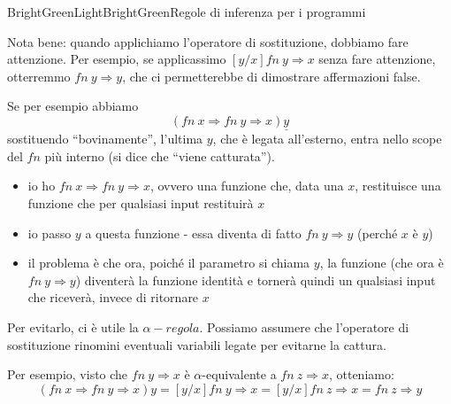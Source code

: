 \documentclass[a4paper,11pt]{report}
\begin{document}
\begin{cdefframe}{BrightGreenLight}{BrightGreen}{Regole di inferenza per i programmi}
\begin{gframe}{}
    Nota bene: quando applichiamo l'operatore di sostituzione, dobbiamo fare attenzione.
    Per esempio, se applicassimo \( [y/x] fn \ y \Rightarrow x \) senza fare attenzione, otterremmo \( fn \ y \Rightarrow y \), che ci permetterebbe di dimostrare affermazioni false.

Se per esempio abbiamo
\[  (fn \ x \Rightarrow fn \ y \Rightarrow x) \underline{y} \]
sostituendo ``bovinamente'', l'ultima \( y \), che è legata all'esterno, entra nello scope del \( fn \) più interno (si dice che ``viene catturata'').

\begin{itemize}
    \item io ho \( fn \ x \Rightarrow fn \ y \Rightarrow x \), ovvero una funzione che, data una \( x \), restituisce una funzione che per qualsiasi input restituirà \( x \)
    \item io passo \( y \) a questa funzione - essa diventa di fatto \( fn \ y \Rightarrow y \) (perché \( x \) è \( y \))
    \item il problema è che ora, poiché il parametro si chiama \( y \), la funzione (che ora è \( fn \ y \Rightarrow y \)) diventerà la funzione identità e tornerà quindi un qualsiasi input che riceverà, invece di ritornare \( x \)
\end{itemize}

Per evitarlo, ci è utile la \( \alpha-regola \). Possiamo assumere che l'operatore di sostituzione rinomini eventuali variabili legate per evitarne la cattura.

Per esempio, visto che \( fn \ y \Rightarrow x \) è \( \alpha\)-equivalente a \( fn \ z \Rightarrow x \), otteniamo:
\[ (fn \ x \Rightarrow fn \ y \Rightarrow x) y = [y/x] fn \ y \Rightarrow  x = [y/x] fn \ z \Rightarrow x = fn \ z \Rightarrow y \]
\end{gframe}

\end{cdefframe}
\end{document}
